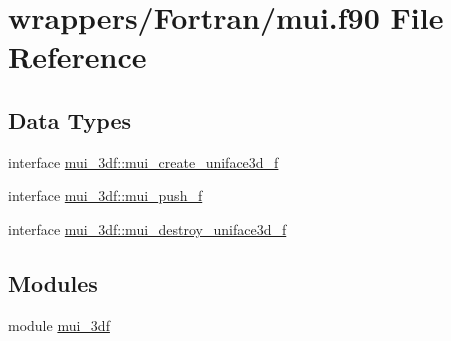 \hypertarget{mui_8f90}{}\section{wrappers/\+Fortran/mui.f90 File Reference}
\label{mui_8f90}
\subsection*{Data Types}
\begin{DoxyCompactItemize}
\item 
interface \hyperlink{interfacemui__3df_1_1mui__create__uniface3d__f}{mui\+\_\+3df\+::mui\+\_\+create\+\_\+uniface3d\+\_\+f}
\item 
interface \hyperlink{interfacemui__3df_1_1mui__push__f}{mui\+\_\+3df\+::mui\+\_\+push\+\_\+f}
\item 
interface \hyperlink{interfacemui__3df_1_1mui__destroy__uniface3d__f}{mui\+\_\+3df\+::mui\+\_\+destroy\+\_\+uniface3d\+\_\+f}
\end{DoxyCompactItemize}
\subsection*{Modules}
\begin{DoxyCompactItemize}
\item 
module \hyperlink{namespacemui__3df}{mui\+\_\+3df}
\end{DoxyCompactItemize}
